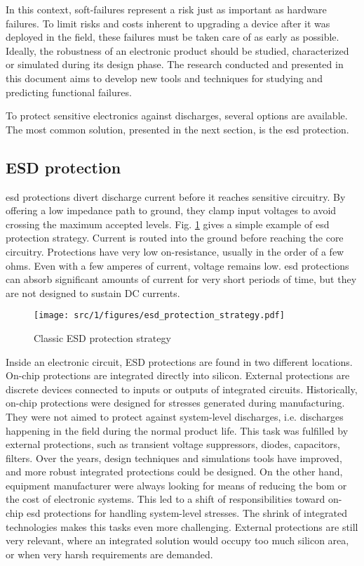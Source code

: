 In this context, soft-failures represent a risk just as important as hardware failures.
To limit risks and costs inherent to upgrading a device after it was deployed in the field, these failures must be taken care of as early as possible.
Ideally, the robustness of an electronic product should be studied, characterized or simulated during its design phase.
The research conducted and presented in this document aims to develop new tools and techniques for studying and predicting functional failures.

To protect sensitive electronics against discharges, several options are available.
The most common solution, presented in the next section, is the \gls{esd} protection.

\subsection{ESD protection}

\gls{esd} protections divert discharge current before it reaches sensitive circuitry.
By offering a low impedance path to ground, they clamp input voltages to avoid crossing the maximum accepted levels.
Fig. \ref{fig:esd-protection-strategy} gives a simple example of \gls{esd} protection strategy.
Current is routed into the ground before reaching the core circuitry.
Protections have very low on-resistance, usually in the order of a few ohms.
Even with a few amperes of current, voltage remains low.
\gls{esd} protections can absorb significant amounts of current for very short periods of time, but they are not designed to sustain DC currents.

\begin{figure}[!h]
  \centering
  \texttt{[image: src/1/figures/esd\_protection\_strategy.pdf]}
  \caption{Classic ESD protection strategy}
  \label{fig:esd-protection-strategy}
\end{figure}

Inside an electronic circuit, ESD protections are found in two different locations.
On-chip protections are integrated directly into silicon.
External protections are discrete devices connected to inputs or outputs of integrated circuits.
Historically, on-chip protections were designed for stresses generated during manufacturing.
They were not aimed to protect against system-level discharges, i.e. discharges happening in the field during the normal product life.
This task was fulfilled by external protections, such as transient voltage suppressors, diodes, capacitors, filters.
Over the years, design techniques and simulations tools have improved, and more robust integrated protections could be designed.
On the other hand, equipment manufacturer were always looking for means of reducing the \gls{bom} or the cost of electronic systems.
This led to a shift of responsibilities toward on-chip \gls{esd} protections for handling system-level stresses.
The shrink of integrated technologies makes this tasks even more challenging.
External protections are still very relevant, where an integrated solution would occupy too much silicon area, or when very harsh requirements are demanded.

